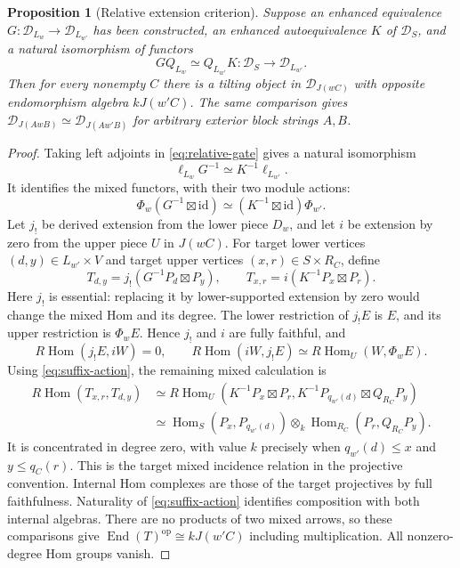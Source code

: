\documentclass[11pt]{article}
\newtheorem{proposition}[theorem]{Proposition}
\theoremstyle{definition}
\newcommand{\Hom}{\operatorname{Hom}}
\newcommand{\End}{\operatorname{End}}
\begin{document}
\begin{proposition}[Relative extension criterion]\label{prop:relative-extension}
Suppose an enhanced equivalence
$G:\mathcal D_{L_w}\to\mathcal D_{L_{w'}}$ has been constructed,
an enhanced autoequivalence $K$ of $\mathcal D_S$, and a natural
isomorphism of functors
\begin{equation}\label{eq:relative-gate}
 GQ_{L_w}\simeq Q_{L_{w'}}K:\mathcal D_S\longrightarrow
                                      \mathcal D_{L_{w'}}.
\end{equation}
Then for every nonempty $C$ there is a tilting object in
$\mathcal D_{J(wC)}$ with opposite endomorphism algebra $kJ(w'C)$.
The same comparison gives $\mathcal D_{J(AwB)}\simeq
\mathcal D_{J(Aw'B)}$ for arbitrary exterior block strings $A,B$.
\end{proposition}
\begin{proof}
Taking left adjoints in \eqref{eq:relative-gate} gives a natural
isomorphism
\[
 \ell_{L_w}G^{-1}\simeq K^{-1}\ell_{L_{w'}}.
\]
It identifies the mixed functors, with their two module actions:
\begin{equation}\label{eq:suffix-action}
 \Phi_w(G^{-1}\boxtimes\mathrm{id})\simeq
 (K^{-1}\boxtimes\mathrm{id})\Phi_{w'}.
\end{equation}
Let $j_!$ be derived extension from the lower piece $D_w$, and let
$i$ be extension by zero from the upper piece $U$ in $J(wC)$.
For target lower vertices $(d,y)\in L_{w'}\times V$ and target
upper vertices $(x,r)\in S\times R_C$, define
\[
 T_{d,y}=j_!(G^{-1}P_d\boxtimes P_y),\qquad
 T_{x,r}=i(K^{-1}P_x\boxtimes P_r).
\]
Here $j_!$ is essential: replacing it by lower-supported extension
by zero would change the mixed Hom and its degree.
The lower restriction of $j_!E$ is $E$, and its upper restriction
is $\Phi_wE$. Hence $j_!$ and $i$ are fully faithful, and
\[
 R\Hom(j_!E,iW)=0,\qquad
 R\Hom(iW,j_!E)\simeq R\Hom_U(W,\Phi_wE).
\]
Using \eqref{eq:suffix-action}, the remaining mixed calculation is
\begin{align*}
 R\Hom(T_{x,r},T_{d,y})
 &\simeq R\Hom_U(K^{-1}P_x\boxtimes P_r,
                         K^{-1}P_{q_{w'}(d)}\boxtimes Q_{R_C}P_y)\\
 &\simeq \Hom_S(P_x,P_{q_{w'}(d)})\otimes_k
                         \Hom_{R_C}(P_r,Q_{R_C}P_y).
\end{align*}
It is concentrated in degree zero, with value $k$ precisely when
$q_{w'}(d)\leq x$ and $y\leq q_C(r)$. This is the target mixed
incidence relation in the projective convention. Internal Hom
complexes are those of the target projectives by full faithfulness.
Naturality of \eqref{eq:suffix-action} identifies composition with
both internal algebras. There are no products of two mixed arrows,
so these comparisons give $\End(T)^{\mathrm{op}}\cong kJ(w'C)$
including multiplication. All nonzero-degree Hom groups vanish.


\end{proof}
\end{document}

